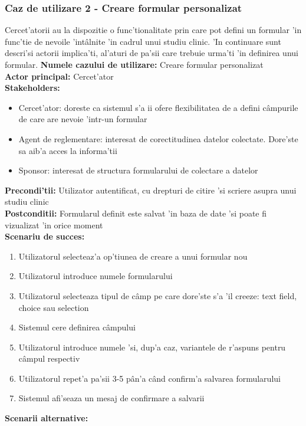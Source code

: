 \documentclass[12pt,a4paper,twoside]{report}
\begin{document}
\subsubsection{Caz de utilizare 2 - Creare formular personalizat}
Cercet'atorii au la dispozitie o func'tionalitate prin care pot defini un formular 'in func'tie de nevoile 'int\^alnite 'in cadrul unui studiu clinic. 'In continuare sunt descri'si actorii implica'ti, al'aturi de pa'sii care trebuie urma'ti 'in definirea unui formular.
\textbf{Numele cazului de utilizare:} Creare formular personalizat\\
\textbf{Actor principal:} Cercet'ator\\
\textbf{Stakeholders:}
\begin{itemize}
    \item Cercet'ator: doreste ca sistemul s'a ii ofere flexibilitatea de a defini c\^ampurile de care are nevoie 'intr-un formular
    \item Agent de reglementare: interesat de corectitudinea datelor colectate. Dore'ste sa aib'a acces la informa'tii
    \item Sponsor: interesat de structura formularului de colectare a datelor
\end{itemize}
\textbf{Precondi'tii:} Utilizator autentificat, cu drepturi de citire 'si scriere asupra unui studiu clinic\\
\textbf{Postconditii:} Formularul definit este salvat 'in baza de date 'si poate fi vizualizat 'in orice moment\\
\textbf{Scenariu de succes:} 
\begin{enumerate}
    \item Utilizatorul selecteaz'a op'tiunea de creare a unui formular nou
    \item Utilizatorul introduce numele formularului
    \item Utilizatorul selecteaza tipul de c\^amp pe care dore'ste s'a 'il creeze: text field, choice sau selection
    \item Sistemul cere definirea c\^ampului
    \item Utilizatorul introduce numele 'si, dup'a caz, variantele de r'aspuns pentru c\^ampul respectiv
    \item Utilizatorul repet'a pa'sii 3-5 p\^an'a c\^and confirm'a salvarea formularului
    \item Sistemul afi'seaza un mesaj de confirmare a salvarii
\end{enumerate}
\textbf{Scenarii alternative:}
\end{document}
